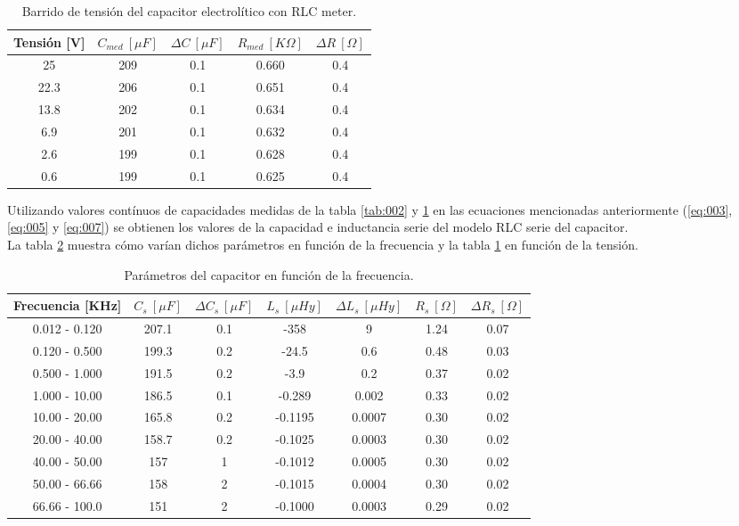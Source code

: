 \documentclass[a4paper,10pt]{article}
\begin{document}
		\begin{table}[!htp]
			\centering
			\begin{tabular}{|c|c|c|c|c|}
				\hline
				Tensión [V] & $C_{med}~[\mu F]$ & $\Delta C~[\mu F]$ & 
				$R_{med}~[K\Omega]$ & $\Delta R~[\Omega]$\\
				\hline
				25 &	209 & 0.1 & 0.660 & 0.4 \\
				\hline
				22.3 &	206 & 0.1 & 0.651 & 0.4 \\
				\hline
				13.8 &	202 & 0.1 & 0.634 & 0.4 \\
				\hline
				6.9 &	201 & 0.1 & 0.632 & 0.4 \\
				\hline
				2.6 &	199 & 0.1 & 0.628 & 0.4 \\
				\hline
				0.6 &	199 & 0.1 & 0.625 & 0.4 \\
				\hline	  
			\end{tabular}
			\caption{Barrido de tensión del capacitor electrolítico con RLC 
			meter.} 
			\label{tab:003}
		\end{table}	

		\indent Utilizando valores contínuos de capacidades medidas de la tabla
		\ref{tab:002} y \ref{tab:003} en las ecuaciones mencionadas anteriormente
		(\ref{eq:003}, \ref{eq:005} y \ref{eq:007}) se obtienen los valores de
		la capacidad e inductancia serie del modelo RLC serie del capacitor. \\
		\indent La tabla \ref{tab:004} muestra cómo varían dichos parámetros en 
		función de la frecuencia y la tabla \ref{tab:003} en función de la 
		tensión.
		
		\begin{table}[!htp]
			\centering
			\begin{tabular}{|c|c|c|c|c|c|c|}
				\hline
				Frecuencia [KHz] & $C_s~[\mu F]$ & $\Delta C_s~[\mu F]$ & 
				$L_s~[\mu Hy]$  & $\Delta L_s~[\mu Hy]$  & $R_s~[\Omega]$ & 
				$\Delta R_s~[\Omega]$ \\
				\hline
				0.012 - 0.120 &	207.1 & 0.1 & -358 & 9 & 1.24 & 0.07 \\
				\hline
				0.120 - 0.500 &	199.3 & 0.2 & -24.5 & 0.6 & 0.48 & 0.03 \\
				\hline
				0.500 - 1.000 &	191.5 & 0.2 & -3.9 & 0.2 & 0.37 & 0.02 \\
				\hline
				1.000 - 10.00 &	186.5 & 0.1 & -0.289 & 0.002 & 0.33 & 0.02 \\
				\hline
				10.00 - 20.00 &	165.8 & 0.2 & -0.1195 & 0.0007 & 0.30 & 0.02 \\
				\hline
				20.00 - 40.00 &	158.7 & 0.2 & -0.1025 & 0.0003 & 0.30 & 0.02 \\
				\hline
				40.00 - 50.00 &	157 & 1 & -0.1012 & 0.0005 & 0.30 & 0.02 \\
				\hline
				50.00 - 66.66 &	158 & 2 & -0.1015 & 0.0004 & 0.30 & 0.02 \\
				\hline
				66.66 - 100.0 &	151 & 2 & -0.1000 & 0.0003 & 0.29 & 0.02 \\
				\hline	  
			\end{tabular}
			\caption{Parámetros del capacitor en función de la frecuencia.} 
			\label{tab:004}
		\end{table}	
		
\end{document}
